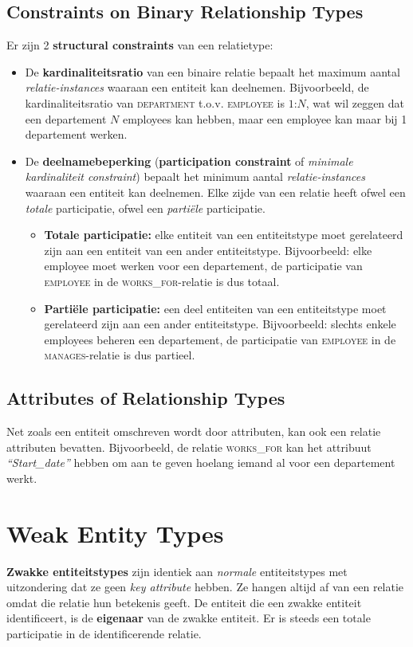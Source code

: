\subsection{Constraints on Binary Relationship Types}
Er zijn 2 \textbf{structural constraints} van een relatietype:
\begin{itemize}
\item De \textbf{kardinaliteitsratio} van een binaire relatie bepaalt het maximum aantal \textit{relatie-instances} waaraan een entiteit kan deelnemen. Bijvoorbeeld, de kardinaliteitsratio van \textsc{department} t.o.v. \textsc{employee} is $1$:$N$, wat wil zeggen dat een departement $N$ employees kan hebben, maar een employee kan maar bij 1 departement werken.

\item De \textbf{deelnamebeperking} (\textbf{participation constraint} of \textit{minimale kardinaliteit constraint}) bepaalt het minimum aantal \textit{relatie-instances} waaraan een entiteit kan deelnemen. Elke zijde van een relatie heeft ofwel een \textit{totale} participatie, ofwel een \textit{parti\"ele} participatie.
\begin{itemize}
\item \textbf{Totale participatie:} elke entiteit van een entiteitstype moet gerelateerd zijn aan een entiteit van een ander entiteitstype. Bijvoorbeeld: elke employee moet werken voor een departement, de participatie van \textsc{employee} in de \textsc{works\_for}-relatie is dus totaal.
\item \textbf{Parti\"ele participatie:} een deel entiteiten van een entiteitstype moet gerelateerd zijn aan een ander entiteitstype. Bijvoorbeeld: slechts enkele employees beheren een departement, de participatie van \textsc{employee} in de \textsc{manages}-relatie is dus partieel.
\end{itemize}
\end{itemize}

\subsection{Attributes of Relationship Types}
Net zoals een entiteit omschreven wordt door attributen, kan ook een relatie attributen bevatten. Bijvoorbeeld, de relatie \textsc{works\_for} kan het attribuut \textit{``Start\_date''} hebben om aan te geven hoelang iemand al voor een departement werkt.


\section{Weak Entity Types}
\textbf{Zwakke entiteitstypes} zijn identiek aan \textit{normale} entiteitstypes met uitzondering dat ze geen \textit{key attribute} hebben. Ze hangen altijd af van een relatie omdat die relatie hun betekenis geeft. De entiteit die een zwakke entiteit identificeert, is de \textbf{eigenaar} van de zwakke entiteit. Er is steeds een totale participatie in de identificerende relatie.

